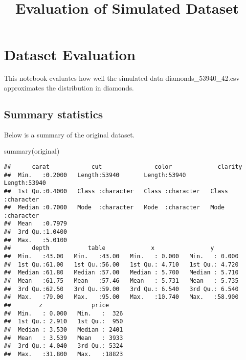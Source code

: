 \documentclass[
]{article}
\title{Evaluation of Simulated Dataset}
\author{}
\date{\vspace{-2.5em}}
\newenvironment{Shaded}{\begin{snugshade}}{\end{snugshade}}
\newcommand{\FunctionTok}[1]{\textcolor[rgb]{0.00,0.00,0.00}{#1}}
\newcommand{\NormalTok}[1]{#1}
\begin{document}
\maketitle

\hypertarget{dataset-evaluation}{%
\section{Dataset Evaluation}\label{dataset-evaluation}}

This notebook evaluates how well the simulated data
diamonds\_53940\_42.csv approximates the distribution in diamonds.

\hypertarget{summary-statistics}{%
\subsection{Summary statistics}\label{summary-statistics}}

Below is a summary of the original dataset.

\begin{Shaded}
\begin{Highlighting}[]
\FunctionTok{summary}\NormalTok{(original)}
\end{Highlighting}
\end{Shaded}

\begin{verbatim}
##      carat            cut               color             clarity         
##  Min.   :0.2000   Length:53940       Length:53940       Length:53940      
##  1st Qu.:0.4000   Class :character   Class :character   Class :character  
##  Median :0.7000   Mode  :character   Mode  :character   Mode  :character  
##  Mean   :0.7979                                                           
##  3rd Qu.:1.0400                                                           
##  Max.   :5.0100                                                           
##      depth           table             x                y         
##  Min.   :43.00   Min.   :43.00   Min.   : 0.000   Min.   : 0.000  
##  1st Qu.:61.00   1st Qu.:56.00   1st Qu.: 4.710   1st Qu.: 4.720  
##  Median :61.80   Median :57.00   Median : 5.700   Median : 5.710  
##  Mean   :61.75   Mean   :57.46   Mean   : 5.731   Mean   : 5.735  
##  3rd Qu.:62.50   3rd Qu.:59.00   3rd Qu.: 6.540   3rd Qu.: 6.540  
##  Max.   :79.00   Max.   :95.00   Max.   :10.740   Max.   :58.900  
##        z              price      
##  Min.   : 0.000   Min.   :  326  
##  1st Qu.: 2.910   1st Qu.:  950  
##  Median : 3.530   Median : 2401  
##  Mean   : 3.539   Mean   : 3933  
##  3rd Qu.: 4.040   3rd Qu.: 5324  
##  Max.   :31.800   Max.   :18823
\end{verbatim}
\end{document}
